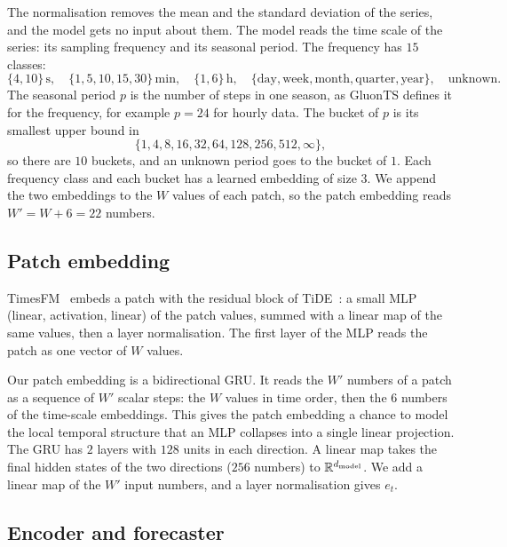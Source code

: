 The normalisation removes the mean and the standard deviation of the
series, and the model gets no input about them. The model reads the time scale
of the series: its sampling frequency and its seasonal period. The
frequency has $15$ classes:
\[
  \{4, 10\}\,\mathrm{s}, \quad
  \{1, 5, 10, 15, 30\}\,\mathrm{min}, \quad
  \{1, 6\}\,\mathrm{h}, \quad
  \{\text{day}, \text{week}, \text{month}, \text{quarter}, \text{year}\}, \quad
  \text{unknown}.
\]
The seasonal period $p$ is the number of steps in one season, as
GluonTS defines it for the frequency, for example $p = 24$ for hourly
data. The bucket of $p$ is its smallest upper bound in
\[
  \{1, 4, 8, 16, 32, 64, 128, 256, 512, \infty\},
\]
so there are $10$ buckets, and an unknown period goes to the bucket of
$1$. Each frequency class and each bucket has a
learned embedding of size $3$. We append the two embeddings to the $W$
values of each patch, so the patch embedding reads $W' = W + 6 = 22$
numbers.

\subsection{Patch embedding}
\label{sec:patch-embedding}

TimesFM~\citep{das2024timesfm} embeds a patch with the residual block of
TiDE~\citep{das2023tide}: a small MLP (linear, activation, linear) of
the patch values, summed with a linear map of the same values, then a
layer normalisation. The first layer of the MLP reads the patch as one
vector of $W$ values.

Our patch embedding is a bidirectional GRU. It reads the $W'$ numbers
of a patch as a sequence of $W'$ scalar steps: the $W$ values in time
order, then the $6$ numbers of the time-scale embeddings. This gives
the patch embedding a chance to model the local temporal structure
that an MLP collapses into a single linear projection. The GRU has
$2$ layers with $128$ units in each direction. A linear map takes the
final hidden states of the two directions ($256$ numbers) to
$\mathbb{R}^{d_{\mathrm{model}}}$. We add a linear map of the $W'$ input numbers, and a
layer normalisation gives $e_t$.

\subsection{Encoder and forecaster}
\label{sec:forecaster}

